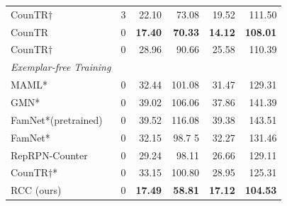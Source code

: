 \begin{tabular}{lcrrrr}
CounTR$\dag$  \cite{liu2022countr} & 3 
 & 22.10 & 73.08 & 19.52 & 111.50 \\
 \color{gray}
CounTR \cite{liu2022countr}  & 0  & \textbf{17.40}  & \textbf{ 70.33}  &  \textbf{14.12}  &  \textbf{108.01}\\ 
\color{gray}
CounTR$\dag$ \cite{liu2022countr} &  0  & 28.96 & 90.66 & 25.58 & 110.39 \\
\midrule
\textit{Exemplar-free Training} & & & & \\
MAML* 
\cite{finn2017model} & 0
& 32.44 & 101.08 & 31.47 & 129.31 \\
GMN* 
\cite{Lu18} & 0
& 39.02 & 106.06& 37.86& 141.39 \\
 FamNet*(pretrained) 
 \cite{ranjan2021Famnet} & 0
 & 39.52 & 116.08 & 39.38 & 143.51 \\
FamNet*
\cite{ranjan2021Famnet} & 0
& 32.15 & 98.7 5& 32.27 & 131.46 \\
\color{gray}
 RepRPN-Counter 
 \cite{ranjan2022exemplar} & 0
 & 29.24 & 98.11 & 26.66 & 129.11 \\
 \color{gray}
 CounTR$\dag$* \cite{liu2022countr} 
 & 0   & 33.15 & 100.80 & 28.95 & 125.31 \\
 \color{black}

RCC (ours) & 0 &  \textbf{17.49}  & \textbf{58.81} & \textbf{17.12}  & \textbf{104.53} \\
\bottomrule

\end{tabular}
